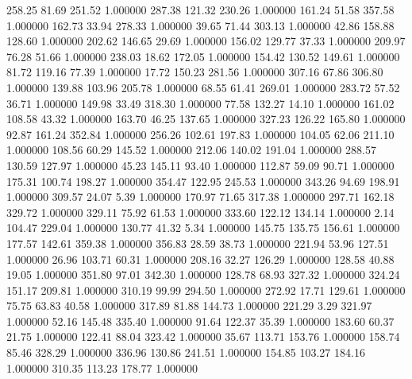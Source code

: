     258.25     81.69    251.52  1.000000
    287.38    121.32    230.26  1.000000
    161.24     51.58    357.58  1.000000
    162.73     33.94    278.33  1.000000
     39.65     71.44    303.13  1.000000
     42.86    158.88    128.60  1.000000
    202.62    146.65     29.69  1.000000
    156.02    129.77     37.33  1.000000
    209.97     76.28     51.66  1.000000
    238.03     18.62    172.05  1.000000
    154.42    130.52    149.61  1.000000
     81.72    119.16     77.39  1.000000
     17.72    150.23    281.56  1.000000
    307.16     67.86    306.80  1.000000
    139.88    103.96    205.78  1.000000
     68.55     61.41    269.01  1.000000
    283.72     57.52     36.71  1.000000
    149.98     33.49    318.30  1.000000
     77.58    132.27     14.10  1.000000
    161.02    108.58     43.32  1.000000
    163.70     46.25    137.65  1.000000
    327.23    126.22    165.80  1.000000
     92.87    161.24    352.84  1.000000
    256.26    102.61    197.83  1.000000
    104.05     62.06    211.10  1.000000
    108.56     60.29    145.52  1.000000
    212.06    140.02    191.04  1.000000
    288.57    130.59    127.97  1.000000
     45.23    145.11     93.40  1.000000
    112.87     59.09     90.71  1.000000
    175.31    100.74    198.27  1.000000
    354.47    122.95    245.53  1.000000
    343.26     94.69    198.91  1.000000
    309.57     24.07      5.39  1.000000
    170.97     71.65    317.38  1.000000
    297.71    162.18    329.72  1.000000
    329.11     75.92     61.53  1.000000
    333.60    122.12    134.14  1.000000
      2.14    104.47    229.04  1.000000
    130.77     41.32      5.34  1.000000
    145.75    135.75    156.61  1.000000
    177.57    142.61    359.38  1.000000
    356.83     28.59     38.73  1.000000
    221.94     53.96    127.51  1.000000
     26.96    103.71     60.31  1.000000
    208.16     32.27    126.29  1.000000
    128.58     40.88     19.05  1.000000
    351.80     97.01    342.30  1.000000
    128.78     68.93    327.32  1.000000
    324.24    151.17    209.81  1.000000
    310.19     99.99    294.50  1.000000
    272.92     17.71    129.61  1.000000
     75.75     63.83     40.58  1.000000
    317.89     81.88    144.73  1.000000
    221.29      3.29    321.97  1.000000
     52.16    145.48    335.40  1.000000
     91.64    122.37     35.39  1.000000
    183.60     60.37     21.75  1.000000
    122.41     88.04    323.42  1.000000
     35.67    113.71    153.76  1.000000
    158.74     85.46    328.29  1.000000
    336.96    130.86    241.51  1.000000
    154.85    103.27    184.16  1.000000
    310.35    113.23    178.77  1.000000
